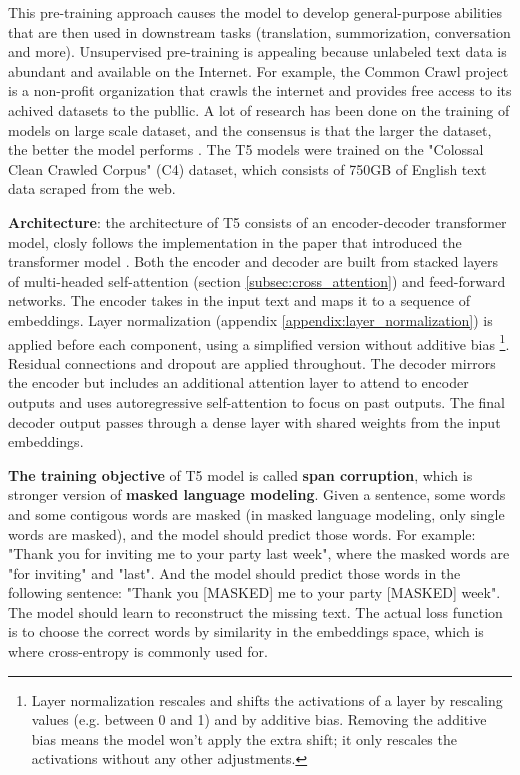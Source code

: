 This pre-training approach causes the model to develop general-purpose abilities that are then used in downstream tasks (translation, summorization, conversation and more). Unsupervised pre-training is appealing because unlabeled text data is abundant and available on the Internet. For example, the Common Crawl project \cite{common_crawl_project} is a non-profit organization that crawls the internet and provides free access to its achived datasets to the publlic. A lot of research has been done on the training of models on large scale dataset, and the consensus is that the larger the dataset, the better the model performs \cite{radford2019language} \cite{jozefowicz2016exploring} \cite{hestness2017deep}. The T5 models were trained on the "Colossal Clean Crawled Corpus" (C4) dataset, which consists of 750GB of English text data scraped from the web.

\textbf{Architecture}: the architecture of T5 consists of an encoder-decoder transformer model, closly follows the implementation in the paper that introduced the transformer model \cite{transformer}. Both the encoder and decoder are built from stacked layers of multi-headed self-attention (section \ref{subsec:cross_attention}) and feed-forward networks. The encoder takes in the input text and maps it to a sequence of embeddings. Layer normalization (appendix \ref{appendix:layer_normalization}) is applied before each component, using a simplified version without additive bias \footnote{Layer normalization rescales and shifts the activations of a layer by rescaling values (e.g. between 0 and 1) and by additive bias. Removing the additive bias means the model won't apply the extra shift; it only rescales the activations without any other adjustments.}. Residual connections and dropout are applied throughout. The decoder mirrors the encoder but includes an additional attention layer to attend to encoder outputs and uses autoregressive self-attention to focus on past outputs. The final decoder output passes through a dense layer with shared weights from the input embeddings.

\textbf{The training objective} of T5 model is called \textbf{span corruption}, which is stronger version of \textbf{masked language modeling}. Given a sentence, some words and some contigous words are masked (in masked language modeling, only single words are masked), and the model should predict those words. For example: "Thank you for inviting me to your party last week", where the masked words are "for inviting" and "last". And the model should predict those words in the following sentence: "Thank you [MASKED] me to your party [MASKED] week". The model should learn to reconstruct the missing text. The actual loss function is to choose the correct words by similarity in the embeddings space, which is where cross-entropy is commonly used for.

